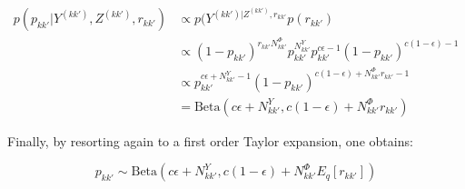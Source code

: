 \begin{align*}
p(p_{kk'} | Y^{(kk')}, Z^{(kk')}, r_{kk'}) &\propto p(Y^{(kk')| Z^{(kk')}, r_{kk'}} p(r_{kk'}) \\
                               &\propto (1-p_{kk'})^{r_{kk'} N^\Phi_{kk'}}p_{kk'}^{N^Y_{kk'}} p_{kk'}^{c\epsilon -1} (1-p_{kk'})^{c(1-\epsilon) -1}\\
                               &\propto p_{kk'}^{c\epsilon + N^Y_{kk'} -1} (1-p_{kk'})^{c(1-\epsilon) + N^\Phi_{kk'}r_{kk'}-1}\\
                               &= \mathrm{Beta}(c\epsilon + N^Y_{kk'}, c(1-\epsilon) + N^\Phi_{kk'}r_{kk'})
\end{align*}

Finally, by resorting again to a first order Taylor expansion, one obtains:

\begin{equation*}
p_{kk'} \sim \mathrm{Beta}(c\epsilon + N^Y_{kk'}, c(1-\epsilon) + N^\Phi_{kk'} E_q[r_{kk'}]) \nonumber
\end{equation*}


%
%
%
%
%
%


